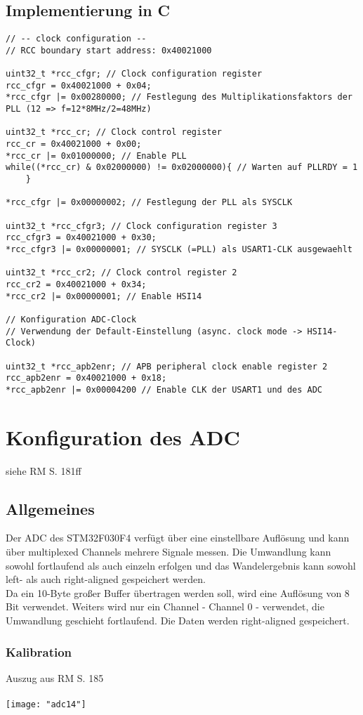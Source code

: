\documentclass[11pt]{report}
\begin{document}
		\subsection{Implementierung in C}
			\begin{lstlisting}
// -- clock configuration --
// RCC boundary start address: 0x40021000

uint32_t *rcc_cfgr; // Clock configuration register
rcc_cfgr = 0x40021000 + 0x04;
*rcc_cfgr |= 0x00280000; // Festlegung des Multiplikationsfaktors der PLL (12 => f=12*8MHz/2=48MHz)

uint32_t *rcc_cr; // Clock control register
rcc_cr = 0x40021000 + 0x00;
*rcc_cr |= 0x01000000; // Enable PLL
while((*rcc_cr) & 0x02000000) != 0x02000000){ // Warten auf PLLRDY = 1
	}

*rcc_cfgr |= 0x00000002; // Festlegung der PLL als SYSCLK

uint32_t *rcc_cfgr3; // Clock configuration register 3
rcc_cfgr3 = 0x40021000 + 0x30;
*rcc_cfgr3 |= 0x00000001; // SYSCLK (=PLL) als USART1-CLK ausgewaehlt

uint32_t *rcc_cr2; // Clock control register 2
rcc_cr2 = 0x40021000 + 0x34;
*rcc_cr2 |= 0x00000001; // Enable HSI14
	
// Konfiguration ADC-Clock
// Verwendung der Default-Einstellung (async. clock mode -> HSI14-Clock)
	
uint32_t *rcc_apb2enr; // APB peripheral clock enable register 2
rcc_apb2enr = 0x40021000 + 0x18;
*rcc_apb2enr |= 0x00004200 // Enable CLK der USART1 und des ADC
			\end{lstlisting}
	\section{Konfiguration des ADC}
		siehe RM S. 181ff
		\subsection{Allgemeines}
			Der ADC des STM32F030F4 verfügt über eine einstellbare Auflösung und kann über multiplexed Channels mehrere Signale messen. Die Umwandlung kann sowohl fortlaufend als auch einzeln erfolgen und das Wandelergebnis kann sowohl left- als auch right-aligned gespeichert werden.\\
			Da ein 10-Byte großer Buffer übertragen werden soll, wird eine Auflösung von 8 Bit verwendet. Weiters wird nur ein Channel - Channel 0 - verwendet, die Umwandlung geschieht fortlaufend. Die Daten werden right-aligned gespeichert.
			\subsubsection{Kalibration}
				Auszug aus RM S. 185\\
				\\\texttt{[image: "adc14"]}\\
\end{document}
